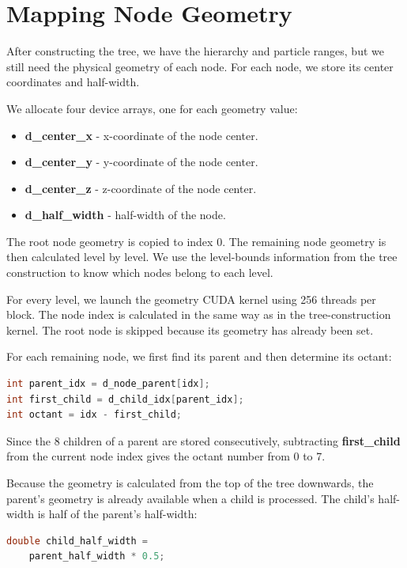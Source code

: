 \section{Mapping Node Geometry}

After constructing the tree, we have the hierarchy and particle ranges, but we still need the physical geometry of each node. For each node, we store its center coordinates and half-width.

We allocate four device arrays, one for each geometry value:

\begin{itemize}
    \item \textbf{d\_center\_x} - x-coordinate of the node center.
    \item \textbf{d\_center\_y} - y-coordinate of the node center.
    \item \textbf{d\_center\_z} - z-coordinate of the node center.
    \item \textbf{d\_half\_width} - half-width of the node.
\end{itemize}

The root node geometry is copied to index 0. The remaining node geometry is then calculated level by level. We use the level-bounds information from the tree construction to know which nodes belong to each level.

For every level, we launch the geometry CUDA kernel using 256 threads per block. The node index is calculated in the same way as in the tree-construction kernel. The root node is skipped because its geometry has already been set.

For each remaining node, we first find its parent and then determine its octant:

\begin{lstlisting}[language=C]
int parent_idx = d_node_parent[idx];
int first_child = d_child_idx[parent_idx];
int octant = idx - first_child;
\end{lstlisting}

Since the 8 children of a parent are stored consecutively, subtracting \textbf{first\_child} from the current node index gives the octant number from 0 to 7.

Because the geometry is calculated from the top of the tree downwards, the parent's geometry is already available when a child is processed. The child's half-width is half of the parent's half-width:

\begin{lstlisting}[language=C]
double child_half_width =
    parent_half_width * 0.5;
\end{lstlisting}

